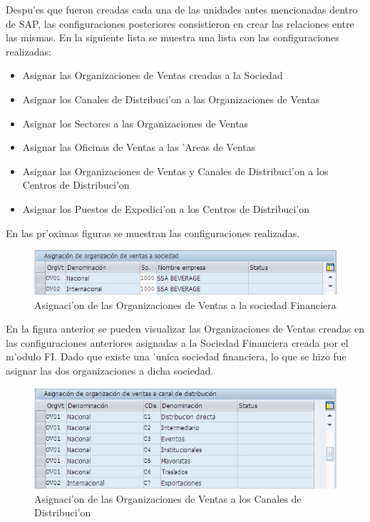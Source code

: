 Despu'es que fueron creadas cada una de las unidades antes mencionadas dentro de SAP, las configuraciones posteriores consistieron en crear las relaciones entre las mismas. En la siguiente lista se muestra una lista con las configuraciones realizadas:
\begin{itemize}
\item Asignar las Organizaciones de Ventas creadas a la Sociedad
\item Asignar los Canales de Distribuci'on a las Organizaciones de Ventas
\item Asignar los Sectores a las Organizaciones de Ventas 
\item Asignar las Oficinas de Ventas a las 'Areas de Ventas
\item Asignar las Organizaciones de Ventas y Canales de Distribuci'on a los Centros de Distribuci'on
\item Asignar los Puestos de Expedici'on a los Centros de Distribuci'on
\end{itemize}
En las pr'oximas figuras se muestran las configuraciones realizadas.
\begin{figure}[H]
\centering
\includegraphics[scale=0.65,type=jpg,ext=.jpg,read=.jpg]{figures/OrgVentasSociedad}
\caption{Asignaci'on de las Organizaciones de Ventas a la sociedad Financiera}
\label{fig:asigna}
\end{figure}
	En la figura anterior se pueden visualizar las Organizaciones de Ventas creadas en las configuraciones anteriores asignadas a la Sociedad Financiera creada por el m'odulo FI. Dado que existe una 'unica sociedad financiera, lo que se hizo fue asignar las dos organizaciones a dicha sociedad.
\begin{figure}[H]
\centering
\includegraphics[scale=0.65,type=jpg,ext=.jpg,read=.jpg]{figures/OrgVentasCanales}
\caption{Asignaci'on de las Organizaciones de Ventas a los Canales de Distribuci'on}
\label{fig:asigna2}
\end{figure}
